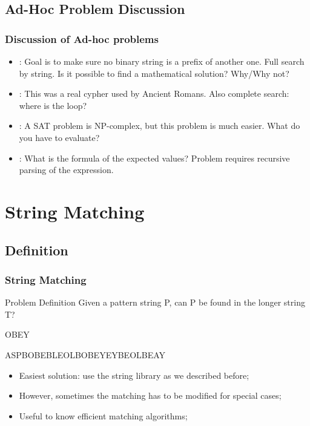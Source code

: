 \documentclass{beamer}
\begin{document}
\subsection{Ad-Hoc Problem Discussion}
\begin{frame}
  \frametitle{Discussion of Ad-hoc problems}
  {\smaller
    \begin{itemize}
    \item {}: Goal is to make sure no
      binary string is a prefix of another one. Full search by string. Is it 
      possible to find a mathematical solution? Why/Why not?
    \item {}: This was a real cypher used by
      Ancient Romans. Also complete search: where is the loop?
    \item {}: A SAT problem is NP-complex, but this 
      problem is much easier. What do you have to evaluate?
    \item {}: What is the formula of the expected values?
      Problem requires recursive parsing of the expression.
    \end{itemize}
        }
\end{frame}

\section{String Matching} %
\subsection{Definition}

\begin{frame}
  \frametitle{String Matching}
  \begin{block}{Problem Definition}
    Given a pattern string P, can P be found in the longer string T?
  \end{block}

  \begin{center}
    OBEY

    \medskip

    ASPBOBEBLEOLBOBEYEYBEOLBEAY
  \end{center}

  \bigskip

  {\smaller
  \begin{itemize}
  \item Easiest solution: use the string library as we described before;
  \item However, sometimes the matching has to be modified for special cases;
  \item Useful to know efficient matching algorithms;
  \end{itemize}
  }

\end{frame}
\end{document}
